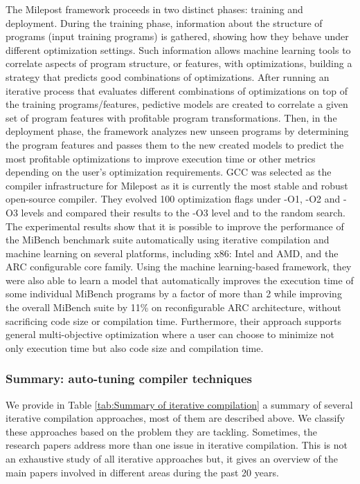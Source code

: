 The Milepost framework proceeds in two distinct phases: training and deployment. During the training phase, information about the structure of programs (input training programs) is gathered, showing how they behave under different optimization settings. Such information allows machine learning tools to correlate aspects of program structure, or features, with optimizations, building a strategy that predicts good combinations of optimizations. 
After running an iterative process that evaluates different combinations of optimizations on top of the training programs/features, pedictive models are created to correlate a given set of program features with profitable program transformations. 
Then, in the deployment phase, the framework analyzes new unseen programs by determining the program features and passes them to the new created models to predict the most profitable optimizations to improve execution time or other metrics depending on the user’s optimization requirements.
GCC was selected as the compiler infrastructure for Milepost as it is currently the most stable and robust open-source compiler. They evolved 100 optimization flags under -O1, -O2 and -O3 levels and compared their results to the -O3 level and to the random search.
The experimental results show that it is possible to improve the performance of the MiBench benchmark suite automatically using iterative compilation and machine learning on several platforms, including x86: Intel and AMD, and the ARC configurable core family. Using the machine learning-based framework, they were also able to learn a model that automatically improves the execution time of some individual MiBench programs by a factor of more than 2 while improving the overall MiBench suite by 11\% on reconfigurable ARC architecture, without sacrificing code size or compilation time. Furthermore, their approach supports general multi-objective optimization where a user can choose to minimize not only execution time but also code size and compilation time.



\subsubsection{Summary: auto-tuning compiler techniques}
We provide in Table \ref{tab:Summary of iterative compilation} a summary of several iterative compilation approaches, most of them are described above. We classify these approaches based on the problem they are tackling. Sometimes, the research papers address more than one issue in iterative compilation. This is not an exhaustive study of all iterative approaches but, it gives an overview of the main papers involved in different areas during the past 20 years.

